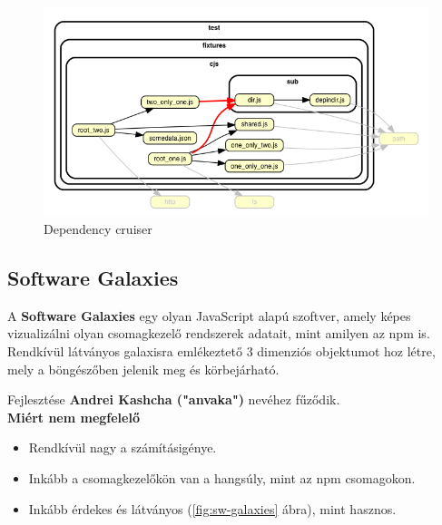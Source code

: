 	\begin{flushright}
		\cite{dep-cruise}
	\end{flushright}
	
	\begin{figure}[h]
		\centering
		\includegraphics[scale=0.5]{images/dep_cruiser.png}
		\caption{Dependency cruiser}
		\label{fig:dep-cruiser}
	\end{figure}
	
	\subsection{Software Galaxies}
	
	A \textbf{Software Galaxies} egy olyan JavaScript alapú szoftver, amely képes vizualizálni olyan csomagkezelő rendszerek adatait, mint amilyen az npm is. Rendkívül látványos galaxisra emlékeztető 3 dimenziós objektumot hoz létre, mely a böngészőben jelenik meg és körbejárható. 
	
	Fejlesztése \textbf{Andrei Kashcha ("anvaka")} nevéhez fűződik.
	\\
	
	
	\textbf{Miért nem megfelelő}
	\begin{itemize}
		\item Rendkívül nagy a számításigénye.
		\item Inkább a csomagkezelőkön van a hangsúly, mint az npm csomagokon.
		\item Inkább érdekes és látványos (\ref{fig:sw-galaxies} ábra), mint hasznos.
	\end{itemize}
	
	\begin{flushright}
		\cite{anvaka-galaxies}
	\end{flushright}
	
